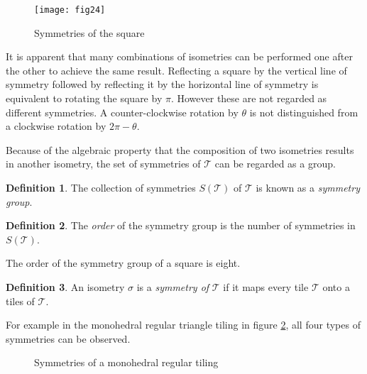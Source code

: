 \documentclass[a4paper,12pt,twoside,abstraction,titlepage]{article}
\theoremstyle{remark}
\theoremstyle{definition}
\newtheorem{definition}{Definition}[section]
\begin{document}
\begin{figure}[h]
\begin{center}
\texttt{[image: fig24]}
\caption{Symmetries of the square\label{square}~\cite{square}}
\vspace{-15pt}
\end{center}
\end{figure}

\noindent It is apparent that many combinations of isometries can be performed one after the other to achieve the same result. Reflecting a square by the vertical line of symmetry followed by reflecting it by the horizontal line of symmetry is equivalent to rotating the square by $\pi$. However these are not regarded as different symmetries. A counter-clockwise rotation by $\theta$ is not distinguished from a clockwise rotation by $2\pi - \theta$. 

Because of the algebraic property that the composition of two isometries results in another isometry, the set of symmetries of $\mathscr{T}$ can be regarded as a group.

\begin{definition}
The collection of symmetries $S(\mathscr{T})$ of $\mathscr{T}$ is known as a \emph{symmetry group}.~\cite[\S 1.3]{branko}
\end{definition}

\begin{definition}
The \emph{order} of the symmetry group is the number of symmetries in $S(\mathscr{T})$.~\cite[\S 1.3]{branko}
\end{definition}

\noindent The order of the symmetry group of a square is eight.

\begin{definition}
An isometry $\sigma$ is a \emph{symmetry of} $\mathscr{T}$ if it maps every tile $\mathscr{T}$ onto a tiles of $\mathscr{T}$.~\cite[\S 1.3]{branko}
\end{definition} 

\noindent For example in the monohedral regular triangle tiling in figure \ref{triangles}, all four types of symmetries can be observed. 

\begin{figure}[h]
\begin{center}
\makebox[\textwidth]{\framebox[5cm]{\rule{0pt}{5cm}}}
\caption{Symmetries of a monohedral regular tiling\label{triangles}~\cite[p28]{branko}}
\vspace{-15pt}
\end{center}
\end{figure}
\end{document}
